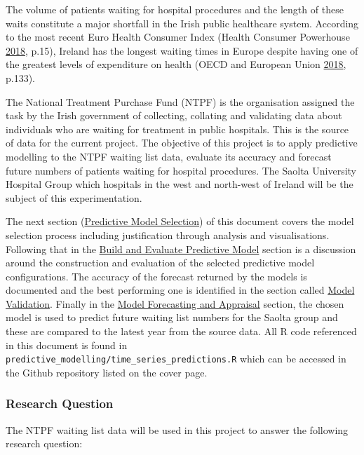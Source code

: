 \documentclass[
  12pt,
]{article}
\begin{document}
The volume of patients waiting for hospital procedures and the length of these waits constitute a major shortfall in the Irish public healthcare system. According to the most recent Euro Health Consumer Index (Health Consumer Powerhouse \protect\hyperlink{ref-health_consumer_powerhouse_euro_2018}{2018}, p.15), Ireland has the longest waiting times in Europe despite having one of the greatest levels of expenditure on health (OECD and European Union \protect\hyperlink{ref-oecd_health_2018}{2018}, p.133).

The National Treatment Purchase Fund (NTPF) is the organisation assigned the task by the Irish government of collecting, collating and validating data about individuals who are waiting for treatment in public hospitals. This is the source of data for the current project. The objective of this project is to apply predictive modelling to the NTPF waiting list data, evaluate its accuracy and forecast future numbers of patients waiting for hospital procedures. The Saolta University Hospital Group which hospitals in the west and north-west of Ireland will be the subject of this experimentation.

The next section (\hyperref[sec:selection]{Predictive Model Selection}) of this document covers the model selection process including justification through analysis and visualisations. Following that in the \hyperref[sec:build-eval]{Build and Evaluate Predictive Model} section is a discussion around the construction and evaluation of the selected predictive model configurations. The accuracy of the forecast returned by the models is documented and the best performing one is identified in the section called \hyperref[sec:validation]{Model Validation}. Finally in the \hyperref[sec:forecasting]{Model Forecasting and Appraisal} section, the chosen model is used to predict future waiting list numbers for the Saolta group and these are compared to the latest year from the source data. All R code referenced in this document is found in \texttt{predictive\_modelling/time\_series\_predictions.R} which can be accessed in the Github repository listed on the cover page.

\hypertarget{research-question}{%
\subsubsection{Research Question}\label{research-question}}

The NTPF waiting list data will be used in this project to answer the following research question:
\end{document}
